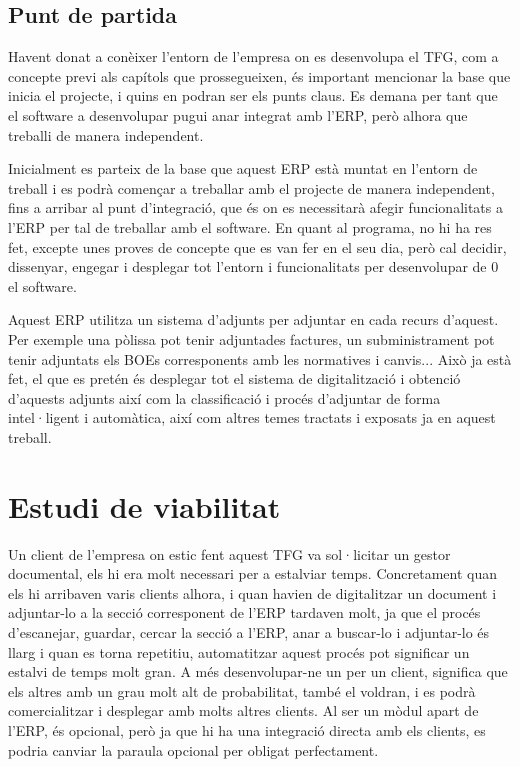 \documentclass[letterpaper,11pt,catalan]{sphinxmanual}
\begin{document}
\section{Punt de partida}
\label{\detokenize{index:punt-de-partida}}
Havent donat a conèixer l'entorn de l'empresa on es desenvolupa el TFG, com a concepte previ
als capítols que prossegueixen, és important mencionar la base que inicia el projecte, i quins
en podran ser els punts claus. Es demana per tant que el software a desenvolupar pugui
anar integrat amb l'ERP, però alhora que treballi de manera independent.

Inicialment es parteix de la base que aquest ERP està muntat en l'entorn de treball i es podrà
començar a treballar amb el projecte de manera independent, fins a arribar al punt d'integració,
que és on es necessitarà afegir funcionalitats a l'ERP per tal de treballar amb el software.
En quant al programa, no hi ha res fet, excepte unes proves de concepte que es van fer en
el seu dia, però cal decidir, dissenyar, engegar i desplegar tot l'entorn i funcionalitats per
desenvolupar de 0 el software.

Aquest ERP utilitza un sistema d'adjunts per adjuntar en cada recurs d'aquest. Per exemple
una pòlissa pot tenir adjuntades factures, un subministrament pot tenir adjuntats els BOEs
corresponents amb les normatives i canvis... Això ja està fet, el que es pretén és desplegar
tot el sistema de digitalització i obtenció d'aquests adjunts així com la classificació
i procés d'adjuntar de forma intel·ligent i automàtica, així com altres temes tractats i
exposats ja en aquest treball.


\chapter{Estudi de viabilitat}
\label{\detokenize{index:estudi-de-viabilitat}}
Un client de l'empresa on estic fent aquest TFG va sol·licitar un gestor documental, els hi
era molt necessari per a estalviar temps. Concretament quan els hi arribaven varis
clients alhora, i quan havien de digitalitzar un document i adjuntar-lo a la secció
corresponent de l'ERP tardaven molt, ja que el procés d'escanejar, guardar, cercar la secció
a l'ERP, anar a buscar-lo i adjuntar-lo és llarg i quan es torna repetitiu, automatitzar aquest
procés pot significar un estalvi de temps molt gran. A més desenvolupar-ne un per un client,
significa que els altres amb un grau molt alt de probabilitat, també el voldran, i es podrà
comercialitzar i desplegar amb molts altres clients. Al ser un mòdul apart de l'ERP, és
opcional, però ja que hi ha una integració directa amb els clients, es podria canviar la paraula opcional per
\sphinxquotedblleft{}obligat\sphinxquotedblright{} perfectament.
\end{document}
